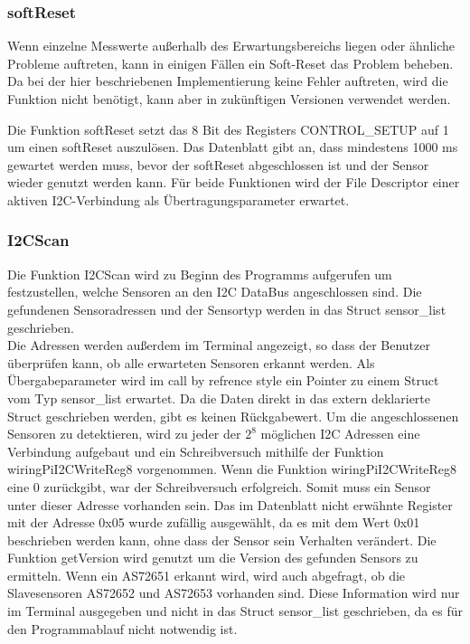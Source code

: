 %

\subsubsection{softReset}
Wenn einzelne Messwerte außerhalb des Erwartungsbereichs liegen oder ähnliche Probleme auftreten, kann in einigen Fällen ein Soft-Reset das Problem beheben.
Da bei der hier beschriebenen Implementierung keine Fehler auftreten, wird die Funktion nicht benötigt, kann aber in zukünftigen Versionen verwendet werden.

\noindent Die Funktion softReset setzt das 8 Bit des Registers CONTROL\_SETUP auf 1 um einen softReset auszulösen.
Das Datenblatt gibt an, dass mindestens 1000 ms gewartet werden muss, bevor der softReset abgeschlossen ist und der Sensor wieder genutzt werden kann.
Für beide Funktionen wird der File Descriptor einer aktiven I2C-Verbindung als Übertragungsparameter erwartet.\\

%

\subsubsection{I2CScan}
Die Funktion I2CScan wird zu Beginn des Programms aufgerufen um festzustellen, welche Sensoren an den I2C DataBus angeschlossen sind.
Die gefundenen Sensoradressen und der Sensortyp werden in das Struct sensor\_list geschrieben.\\
Die Adressen werden außerdem im Terminal angezeigt, so dass der Benutzer überprüfen kann, ob alle erwarteten Sensoren erkannt werden.
Als Übergabeparameter wird im call by refrence style ein Pointer zu einem Struct vom Typ sensor\_list erwartet.
Da die Daten direkt in das extern deklarierte Struct geschrieben werden, gibt es keinen Rückgabewert.
Um die angeschlossenen Sensoren zu detektieren, wird zu jeder der $2^8$ möglichen I2C Adressen eine Verbindung aufgebaut und ein Schreibversuch mithilfe der Funktion wiringPiI2CWriteReg8 vorgenommen.
Wenn die Funktion wiringPiI2CWriteReg8 eine 0 zurückgibt, war der Schreibversuch erfolgreich. Somit muss ein Sensor unter dieser Adresse vorhanden sein.
Das im Datenblatt nicht erwähnte Register mit der Adresse 0x05 wurde zufällig ausgewählt, da es mit dem Wert 0x01 beschrieben werden kann, ohne dass der Sensor sein Verhalten verändert.
Die Funktion getVersion wird genutzt um die Version des gefunden Sensors zu ermitteln.
Wenn ein AS72651 erkannt wird, wird auch abgefragt, ob die Slavesensoren AS72652 und AS72653 vorhanden sind. Diese Information wird nur im Terminal ausgegeben und nicht in das Struct sensor\_list geschrieben, da es für den Programmablauf nicht notwendig ist.\\

